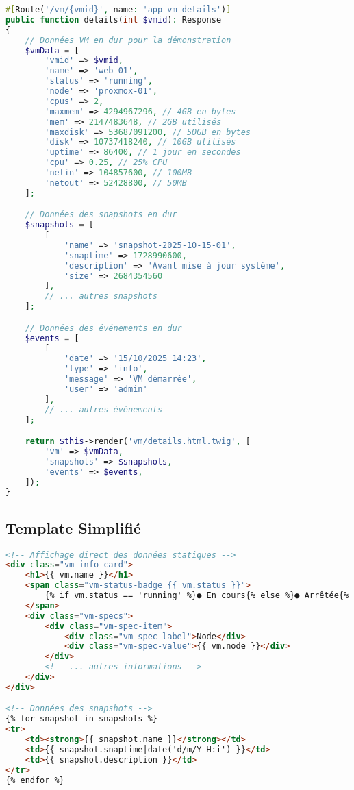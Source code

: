 \documentclass[12pt,a4paper]{report}
\begin{document}
\begin{lstlisting}[language=PHP, caption=Contrôleur en mode démonstration]
#[Route('/vm/{vmid}', name: 'app_vm_details')]
public function details(int $vmid): Response
{
    // Données VM en dur pour la démonstration
    $vmData = [
        'vmid' => $vmid,
        'name' => 'web-01',
        'status' => 'running',
        'node' => 'proxmox-01',
        'cpus' => 2,
        'maxmem' => 4294967296, // 4GB en bytes
        'mem' => 2147483648, // 2GB utilisés
        'maxdisk' => 53687091200, // 50GB en bytes
        'disk' => 10737418240, // 10GB utilisés
        'uptime' => 86400, // 1 jour en secondes
        'cpu' => 0.25, // 25% CPU
        'netin' => 104857600, // 100MB
        'netout' => 52428800, // 50MB
    ];

    // Données des snapshots en dur
    $snapshots = [
        [
            'name' => 'snapshot-2025-10-15-01',
            'snaptime' => 1728990600,
            'description' => 'Avant mise à jour système',
            'size' => 2684354560
        ],
        // ... autres snapshots
    ];

    // Données des événements en dur
    $events = [
        [
            'date' => '15/10/2025 14:23',
            'type' => 'info',
            'message' => 'VM démarrée',
            'user' => 'admin'
        ],
        // ... autres événements
    ];

    return $this->render('vm/details.html.twig', [
        'vm' => $vmData,
        'snapshots' => $snapshots,
        'events' => $events,
    ]);
}
\end{lstlisting}

\subsection{Template Simplifié}

\begin{lstlisting}[language=HTML, caption=Template en mode démonstration]
<!-- Affichage direct des données statiques -->
<div class="vm-info-card">
    <h1>{{ vm.name }}</h1>
    <span class="vm-status-badge {{ vm.status }}">
        {% if vm.status == 'running' %}● En cours{% else %}● Arrêtée{% endif %}
    </span>
    <div class="vm-specs">
        <div class="vm-spec-item">
            <div class="vm-spec-label">Node</div>
            <div class="vm-spec-value">{{ vm.node }}</div>
        </div>
        <!-- ... autres informations -->
    </div>
</div>

<!-- Données des snapshots -->
{% for snapshot in snapshots %}
<tr>
    <td><strong>{{ snapshot.name }}</strong></td>
    <td>{{ snapshot.snaptime|date('d/m/Y H:i') }}</td>
    <td>{{ snapshot.description }}</td>
</tr>
{% endfor %}
\end{lstlisting}
\end{document}
